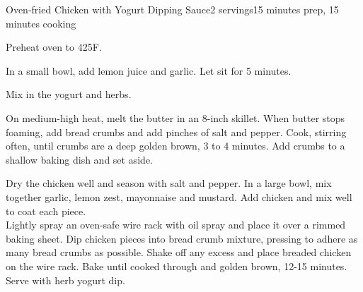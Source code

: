 \documentclass[../Cookbook.tex]{subfiles}
\begin{document}
\begin{recipe}{Oven-fried Chicken with Yogurt Dipping Sauce}{2 servings}{15 minutes prep, 15 minutes cooking}

Preheat oven to 425\0F.

In a small bowl, add lemon juice and garlic. Let sit for 5 minutes.

Mix in the yogurt and herbs.

On medium-high heat, melt the butter in an 8-inch skillet. When butter stops foaming, add bread crumbs and add pinches of salt and pepper. Cook, stirring often, until crumbs are a deep golden brown, 3 to 4 minutes. Add crumbs to a shallow baking dish and set aside.

Dry the chicken well and season with salt and pepper. In a large bowl, mix together garlic, lemon zest, mayonnaise and mustard. Add chicken and mix well to coat each piece.\\
Lightly spray an oven-safe wire rack with oil spray and place it over a rimmed baking sheet. Dip chicken pieces into bread crumb mixture, pressing to adhere as many bread crumbs as possible. Shake off any excess and place breaded chicken on the wire rack. Bake until cooked through and golden brown, 12-15 minutes. Serve with herb yogurt dip.


\end{recipe}
\end{document}
